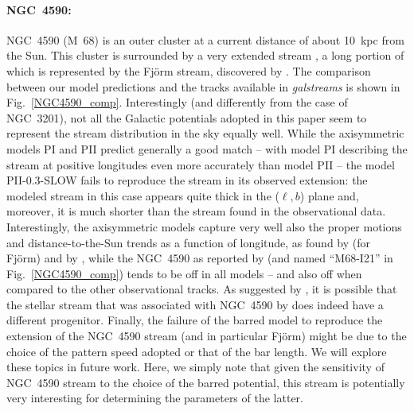             \paragraph{NGC~4590: } NGC~4590 (M~68) is an outer cluster at a current distance of about 10~kpc from the Sun. This cluster is surrounded by a very extended stream \citep{2019MNRAS.488.1535P, 2021ApJ...914..123I}, a long portion of which is represented by the Fj\"{o}rm stream, discovered by \citet{2021ApJ...914..123I}. The comparison between our model predictions and the tracks available in \textit{galstreams} is shown in Fig.~\ref{NGC4590_comp}. Interestingly (and differently from the case of NGC~3201), not all the Galactic potentials adopted in this paper seem to represent the stream distribution in the sky equally well. While the axisymmetric models PI and PII predict generally a good match -- with model PI describing the stream at positive longitudes even more accurately than model PII -- the model PII-0.3-SLOW fails to reproduce the stream in its observed extension: the modeled stream in this case appears quite thick in the ($\ell, b$) plane and, moreover, it is much shorter than the stream found in the observational data. Interestingly, the axisymmetric models capture very well also the proper motions and distance-to-the-Sun trends as a function of longitude, as found by \citet{2021ApJ...914..123I} (for  Fj\"{o}rm) and by \citet{2019MNRAS.488.1535P}, while the NGC~4590 as reported by \citet{2021ApJ...914..123I} (and named ``M68-I21'' in Fig.~\ref{NGC4590_comp}) tends to be off in all models -- and also off when compared to the other observational tracks. As suggested by \citet{2023MNRAS.520.5225M}, it is possible that the stellar stream that was associated with NGC~4590   by  \citet{2021ApJ...914..123I}does indeed have a different progenitor.  Finally, the failure of the barred model to reproduce the extension of the NGC~4590 stream (and in particular Fj\"{o}rm)  might be due to the choice of the pattern speed adopted or that of the bar length. We will explore these topics in future work. Here, we simply note that given the sensitivity of NGC~4590 stream to the choice of the barred potential, this stream is potentially very interesting for determining the parameters of the latter. 

